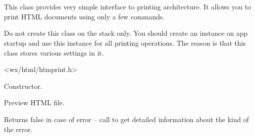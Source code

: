 %
%

\section{}\label{wxhtmleasyprinting}

This class provides very simple interface to printing 
architecture. It allows you to print HTML documents using
only a few commands. 


Do not create this class on the stack only. You should create an instance on app 
startup and use this instance for all printing operations. The reason is that
this class stores various settings in it.




<wx/html/htmprint.h>



\label{wxhtmleasyprintingwxhtmleasyprinting}


Constructor.




\label{wxhtmleasyprintingpreviewfile}


Preview HTML file. 

Returns false in case of error -- call
 to get detailed
information about the kind of the error.


\label{wxhtmleasyprintingpreviewtext}


